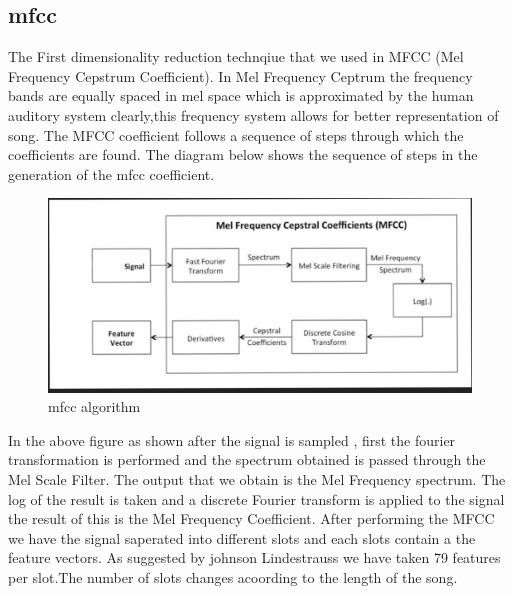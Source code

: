 \documentclass[12pt]{article}
\begin{document}
\subsection{mfcc}
The First dimensionality reduction technqiue that we used in MFCC (Mel Frequency Cepstrum Coefficient). In Mel Frequency Ceptrum the frequency bands are equally spaced in mel space which is approximated by the human auditory system clearly,this frequency system allows for better representation of song.
The MFCC coefficient follows a sequence of steps through which the coefficients are found.
The diagram below shows the sequence of steps in the generation of the mfcc coefficient.
\begin{figure}[H]
\center
\includegraphics [scale=0.5]{mfcc.png}
\caption{mfcc algorithm}
\end{figure}
In the above figure as shown after the signal is sampled , first the fourier transformation is performed and the spectrum obtained is passed through the Mel Scale Filter. The output that we obtain is the Mel Frequency spectrum.
The log of the result is taken and a discrete Fourier transform is applied to the signal the result of this is the Mel Frequency Coefficient.
After performing the MFCC we have the signal saperated into different slots and each slots contain a the feature vectors. As suggested by johnson Lindestrauss we have taken 79 features per slot.The number of slots changes acoording to the length of the song.
\end{document}
